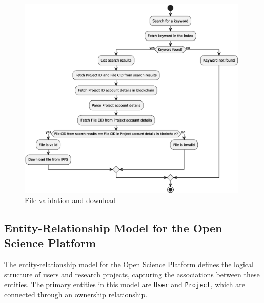 \documentclass{article}
\begin{document}
\begin{figure}[htbp]
      \centering
      \includegraphics[width=0.98\textwidth, keepaspectratio]{keyword_and_file_validation.eps}
      \caption{File validation and download}
      \label{fig:c4_file_validation}
\end{figure}



\subsection{Entity-Relationship Model for the Open Science Platform}

The entity-relationship model for the Open Science Platform defines the logical structure of users and research projects, capturing the associations between these entities. The primary entities in this model are \texttt{User} and \texttt{Project}, which are connected through an ownership relationship.
\end{document}
